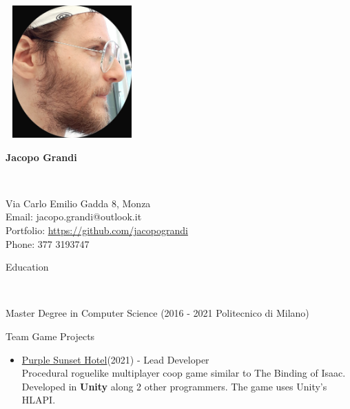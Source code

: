 \documentclass[10pt]{article}
\begin{document}
\setlength{\parindent}{0in}
\thispagestyle{empty} 
{\selectfont

\begin{multicols}{2}

	\includegraphics[height=2in, width=2in]{me_pirate}
	\vfill

	\begin{flushright}
		\begin{Huge}\textbf{Jacopo Grandi} \end{Huge} \\
		\vfill

		Via Carlo Emilio Gadda 8, Monza \\
		Email: jacopo.grandi@outlook.it \\
		\textcolor{coolred} { Portfolio: \url{https://github.com/jacopograndi}} \\
		Phone: 377 3193747 \\
	\end{flushright}
\end{multicols}

\vspace{0.2in}

\begin{Large} \textcolor{coolorange} { Education } \end{Large} \\

\medskip

Master Degree in Computer Science (2016 - 2021 Politecnico di Milano) \\

\vspace{0.25in}


\begin{Large} \textcolor{coolorange} { Team Game Projects } \end{Large}
\begin{itemize}
\item \textcolor{coolred} { \href{https://github.com/soulsofarmony/PurpleSunsetHotel} {Purple Sunset Hotel}}(2021) - Lead Developer \\
	Procedural roguelike multiplayer coop game similar to The Binding of Isaac.
		Developed in \textbf{Unity} along 2 other programmers. The game uses Unity's HLAPI.


\end{itemize}}
\end{document}
